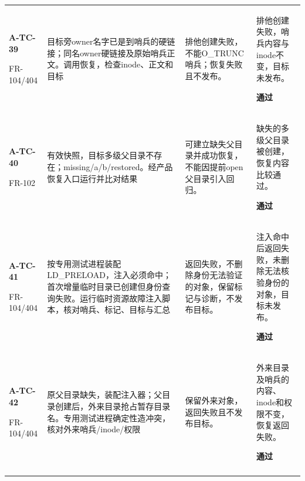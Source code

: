 \begin{longtable}{@{}L{.14\linewidth}L{.36\linewidth}L{.21\linewidth}L{.23\linewidth}@{}}
\textbf{A-TC-39}\par{\footnotesize FR-104/404} & 目标旁owner名字已是到哨兵的硬链接；同名owner硬链接及原始哨兵正文。调用恢复，检查inode、正文和目标 & 排他创建失败，不能O\_TRUNC哨兵；恢复失败且不发布。 & 排他创建失败，哨兵内容与inode不变，目标未发布。\par\textbf{通过}\\\addlinespace[2pt]
\textbf{A-TC-40}\par{\footnotesize FR-102} & 有效快照，目标多级父目录不存在；missing/a/b/restored。经产品恢复入口运行并比对结果 & 可建立缺失父目录并成功恢复，不能因提前open父目录引入回归。 & 缺失的多级父目录被创建，恢复内容比较通过。\par\textbf{通过}\\\addlinespace[2pt]
\textbf{A-TC-41}\par{\footnotesize FR-104/404} & 按专用测试进程装配LD\_PRELOAD，注入必须命中；首次增量临时目录已创建但身份查询失败。运行临时资源故障注入脚本，核对哨兵、标记、目标与汇总 & 返回失败，不删除身份无法验证的对象，保留标记与诊断，不发布目标。 & 注入命中后返回失败，未删除无法核验身份的对象，目标未发布。\par\textbf{通过}\\\addlinespace[2pt]
\textbf{A-TC-42}\par{\footnotesize FR-104/404} & 原父目录缺失，装配注入器；父目录创建后，外来目录抢占暂存目录名。专用测试进程确定性造冲突，核对外来哨兵/inode/权限 & 保留外来对象，返回失败且不发布目标。 & 外来目录及哨兵的内容、inode和权限不变，恢复返回失败。\par\textbf{通过}\\\addlinespace[2pt]
\end{longtable}

\endgroup

